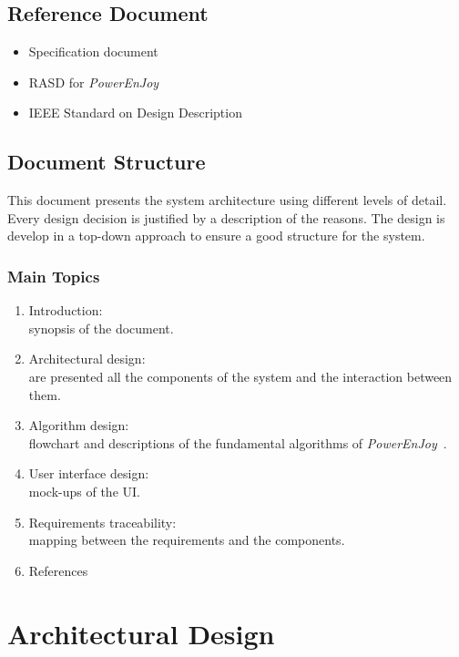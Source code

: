 \documentclass{article}
\newcommand{\pej}{\mbox{\normalfont\itshape PowerEnJoy }}
\begin{document}
		\subsection{Reference Document}
		\begin{itemize}
			\item Specification document
			\item RASD for \pej
			\item IEEE Standard on Design Description
		\end{itemize}
		\pagebreak
		\subsection{Document Structure}
		This document presents the system architecture using different levels of detail. Every design decision is justified by a description of the reasons. The design is develop in a top-down approach to ensure a good structure for the system.
		\subsubsection{Main Topics}
		\begin{enumerate}
			\item Introduction: \\ synopsis of the document.
			\item Architectural design: \\ are presented all the components of the system and the interaction between them.
			\item Algorithm design: \\ flowchart and descriptions of the fundamental algorithms of \pej.
			\item User interface design: \\ mock-ups of the UI.
			\item Requirements traceability: \\ mapping between the requirements and the components.
			\item References
		\end{enumerate}
	\pagebreak
	
	\section{Architectural Design}
\end{document}
